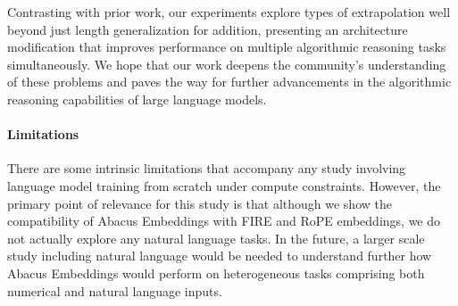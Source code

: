 \documentclass{article}
\begin{document}
Contrasting with prior work, our experiments explore types of extrapolation well beyond just length generalization for addition, presenting an architecture modification that improves performance on multiple algorithmic reasoning tasks simultaneously.
We hope that our work deepens the community's understanding of these problems and paves the way for further advancements in the algorithmic reasoning capabilities of large language models.


\paragraph{Limitations}
There are some intrinsic limitations that accompany any study involving language model training from scratch under compute constraints.
However, the primary point of relevance for this study is that although we show the compatibility of Abacus Embeddings with FIRE and RoPE embeddings, we do not actually explore any natural language tasks.
In the future, a larger scale study including natural language would be needed to understand further how Abacus Embeddings would perform on heterogeneous tasks comprising both numerical and natural language inputs.
\end{document}
